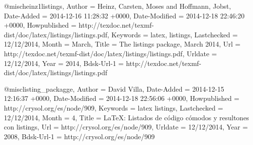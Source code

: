 
@misc{heinz1listings,
	Author = {Heinz, Carsten, Moses and Hoffmann, Jobst},
	Date-Added = {2014-12-16 11:28:32 +0000},
	Date-Modified = {2014-12-18 22:46:20 +0000},
	Howpublished = {http://texdoc.net/texmf-dist/doc/latex/listings/listings.pdf},
	Keywords = {latex, listings},
	Lastchecked = {12/12/2014},
	Month = {March},
	Title = {The listings package, March 2014},
	Url = {http://texdoc.net/texmf-dist/doc/latex/listings/listings.pdf},
	Urldate = {12/12/2014},
	Year = {2014},
	Bdsk-Url-1 = {http://texdoc.net/texmf-dist/doc/latex/listings/listings.pdf}}

@misc{listing_packagge,
	Author = {David Villa},
	Date-Added = {2014-12-15 12:16:37 +0000},
	Date-Modified = {2014-12-18 22:56:06 +0000},
	Howpublished = {http://crysol.org/es/node/909},
	Keywords = {latex listings},
	Lastchecked = {12/12/2014},
	Month = {4},
	Title = {LaTeX: Listados de c{\'o}digo c{\'o}modos y resultones con listings},
	Url = {http://crysol.org/es/node/909},
	Urldate = {12/12/2014},
	Year = {2008},
	Bdsk-Url-1 = {http://crysol.org/es/node/909}}

